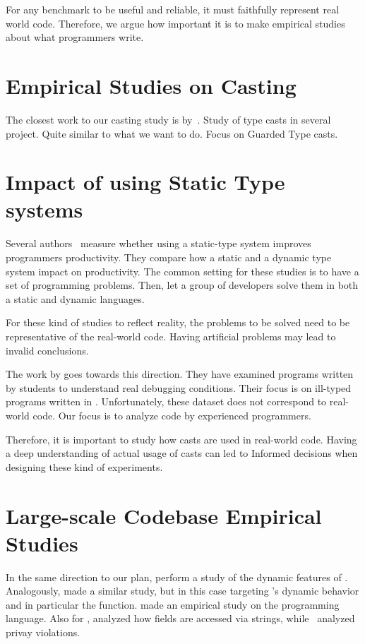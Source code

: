 For any benchmark to be useful and reliable, it must faithfully represent real world code.
Therefore, we argue how important it is to make empirical studies about what programmers write.

\section{Empirical Studies on Casting}

The closest work to our casting study is by~\cite{winther_guarded_2011}.
Study of type casts in several project.
Quite similar to what we want to do.
Focus on Guarded Type casts.


\section{Impact of using Static Type systems}

Several authors~\cite{stuchlik_static_2011,mayer_empirical_2012,harlin_impact_2017} measure whether using a static-type system improves programmers productivity.
They compare how a static and a dynamic type system impact on productivity.
The common setting for these studies is to have a set of programming problems.
Then, let a group of developers solve them in both a static and dynamic languages.

For these kind of studies to reflect reality, the problems to be solved need to
be representative of the real-world code.
Having artificial problems may lead to invalid conclusions.

The work by \cite{wu_how_2017,wu_learning_2017} goes towards this direction.
They have examined programs written by students to understand real debugging conditions.
Their focus is on ill-typed programs written in \haskell{}.
Unfortunately, these dataset does not correspond to real-world code.
Our focus is to analyze code by experienced programmers.

Therefore, it is important to study how casts are used in real-world code.
Having a deep understanding of actual usage of casts can led to
Informed decisions when designing these kind of experiments.

\section{Large-scale Codebase Empirical Studies}

In the same direction to our plan, \cite{callau_how_2013} perform a study of the dynamic features of \smalltalk{}.
Analogously, \cite{richards_analysis_2010,richards_eval_2011} made a similar study, but in this case targeting \javascript{}'s dynamic behavior and in particular the \eval{} function.
\cite{reboucas_empirical_2016} made an empirical study on the \swift{} programming language.
Also for \javascript{}, \cite{madsen_string_2014} analyzed how fields are accessed via strings, while~\cite{jang_empirical_2010} analyzed privay violations.

